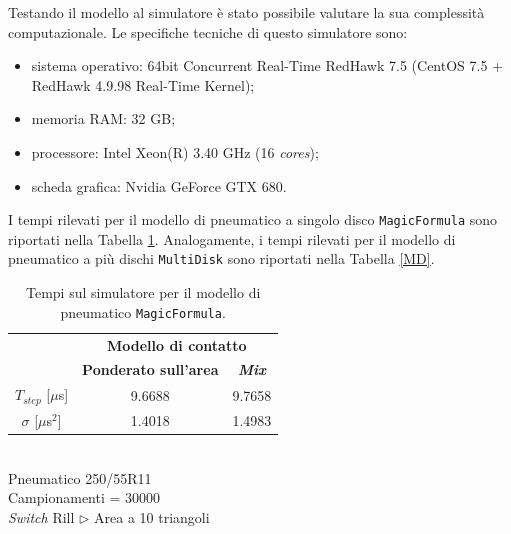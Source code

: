 %
\clearpage
\noindent
Testando il modello al simulatore è stato possibile valutare la sua complessità computazionale. Le specifiche tecniche di questo simulatore sono:
\begin{itemize}
	\item sistema operativo: 64bit Concurrent Real-Time RedHawk 7.5 (CentOS 7.5 + RedHawk 4.9.98 Real-Time Kernel);
	\item memoria RAM: 32 GB;
	\item processore: Intel Xeon(R) 3.40 GHz (16 \textit{cores});
	\item scheda grafica: Nvidia GeForce GTX 680.
\end{itemize}
I tempi rilevati per il modello di pneumatico a singolo disco \texttt{MagicFormula} sono riportati nella Tabella \ref{MF}. Analogamente, i tempi rilevati per il modello di pneumatico a più dischi \texttt{MultiDisk} sono riportati nella Tabella \ref{MD}.
%
\begin{table}
	\centering
	\begin{tabular}{c|c|c|}
		\cline{2-3} 
		& \multicolumn{2}{c|}{\textbf{Modello di contatto}} \\
		\cline{2-3} 
		& \textbf{Ponderato sull'area} & \textbf{\textit{Mix}} \\ 
		\hline
		\multicolumn{1}{|c|}{$T_{step}$ [$\mu$s]} & 9.6688 & 9.7658 \\ 
		\hline 
		\multicolumn{1}{|c|}{$\sigma$ [$\mu$s$^2$]} & 1.4018 & 1.4983 \\ 
		\hline
	\end{tabular}
	\\[0.5cm]
	Pneumatico 250/55R11\\
	Campionamenti = 30000\\
	\textit{Switch} Rill $\triangleright$ Area a 10 triangoli
	\caption{Tempi sul simulatore per il modello di pneumatico \texttt{MagicFormula}.}
	\label{MF}
\end{table}
%
